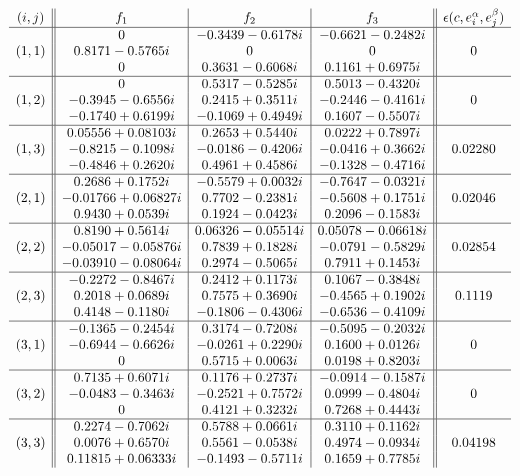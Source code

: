 \newpage
\begin{widetext}

\begin{table}
\centering
\caption{Minimizing bases $\{f_i\}_i$, for the $\alpha=1,\beta=2$ family of states}\label{tbl:first}
\footnotesize
\[
\begin{array}{c||c|c|c||c}
(i,j) & f_1 & f_2 & f_3 & \epsilon(c,e^\alpha_i,e^\beta_j) \\
\hline
&  0 & -0.3439-0.6178 i & -0.6621-0.2482 i \\
 (1,1)  & 0.8171-0.5765 i & 0 & 0 & 0 \\
 & 0 & 0.3631-0.6068 i & 0.1161+0.6975 i  \\
 \hline
  & 0 & 0.5317-0.5285 i & 0.5013-0.4320 i \\
(1,2) & -0.3945-0.6556 i & 0.2415+0.3511 i & -0.2446-0.4161 i & 0 \\
 & -0.1740+0.6199 i & -0.1069+0.4949 i & 0.1607-0.5507 i  \\
 \hline
&  0.05556+0.08103 i & 0.2653+0.5440 i & 0.0222+0.7897 i \\
 (1,3) & -0.8215-0.1098 i & -0.0186-0.4206 i & -0.0416+0.3662 i & 0.02280 \\
 & -0.4846+0.2620 i & 0.4961+0.4586 i & -0.1328-0.4716 i \\
\hline
 &0.2686+0.1752 i & -0.5579+0.0032 i & -0.7647-0.0321 i \\
(2,1) &  -0.01766+0.06827 i & 0.7702-0.2381 i & -0.5608+0.1751 i & 0.02046 \\
& 0.9430+0.0539 i & 0.1924-0.0423 i & 0.2096-0.1583 i \\
\hline
& 0.8190+0.5614 i & 0.06326-0.05514 i & 0.05078-0.06618 i \\
(2,2) & -0.05017-0.05876 i & 0.7839+0.1828 i & -0.0791-0.5829 i & 0.02854 \\
 & -0.03910-0.08064 i & 0.2974-0.5065 i & 0.7911+0.1453 i \\
\hline
&  -0.2272-0.8467 i & 0.2412+0.1173 i & 0.1067-0.3848 i \\
 (2,3) & 0.2018+0.0689 i & 0.7575+0.3690 i & -0.4565+0.1902 i & 0.1119\\
& 0.4148-0.1180 i & -0.1806-0.4306 i & -0.6536-0.4109 i \\
\hline
& -0.1365-0.2454 i & 0.3174-0.7208 i & -0.5095-0.2032 i \\
 (3,1) & -0.6944-0.6626 i & -0.0261+0.2290 i & 0.1600+0.0126 i & 0 \\
& 0 & 0.5715+0.0063 i & 0.0198+0.8203 i \\
\hline
& 0.7135+0.6071 i & 0.1176+0.2737 i & -0.0914-0.1587 i \\
(3,2) &  -0.0483-0.3463 i & -0.2521+0.7572 i & 0.0999-0.4804 i & 0\\
& 0 & 0.4121+0.3232 i & 0.7268+0.4443 i \\
\hline
&  0.2274-0.7062 i & 0.5788+0.0661 i & 0.3110+0.1162 i \\
(3,3) &  0.0076+0.6570 i & 0.5561-0.0538 i & 0.4974-0.0934 i & 0.04198\\
& 0.11815+0.06333 i & -0.1493-0.5711 i & 0.1659+0.7785 i 
\end{array}
\]
\end{table}




\end{widetext}
